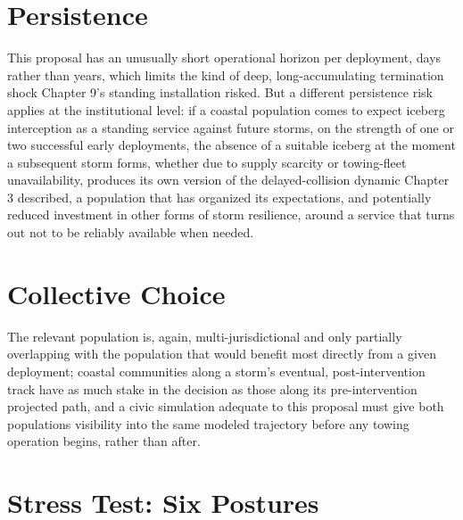 \documentclass[11pt,oneside]{book}
\begin{document}
\section*{Persistence}

This proposal has an unusually short operational horizon per deployment, days rather than years, which limits the kind of deep, long-accumulating termination shock Chapter 9's standing installation risked. But a different persistence risk applies at the institutional level: if a coastal population comes to expect iceberg interception as a standing service against future storms, on the strength of one or two successful early deployments, the absence of a suitable iceberg at the moment a subsequent storm forms, whether due to supply scarcity or towing-fleet unavailability, produces its own version of the delayed-collision dynamic Chapter 3 described, a population that has organized its expectations, and potentially reduced investment in other forms of storm resilience, around a service that turns out not to be reliably available when needed.

\section*{Collective Choice}

The relevant population is, again, multi-jurisdictional and only partially overlapping with the population that would benefit most directly from a given deployment; coastal communities along a storm's eventual, post-intervention track have as much stake in the decision as those along its pre-intervention projected path, and a civic simulation adequate to this proposal must give both populations visibility into the same modeled trajectory before any towing operation begins, rather than after.

\section*{Stress Test: Six Postures}
\end{document}
